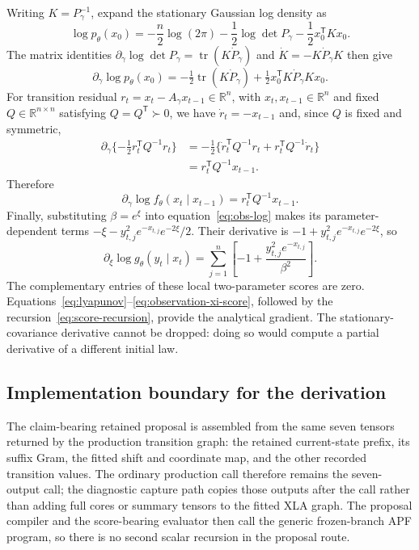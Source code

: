 \documentclass[11pt]{article}
\begin{document}
Writing $K=P_\gamma^{-1}$, expand the stationary Gaussian log density as
\[
\log p_\theta(x_0)
=-\frac n2\log(2\pi)-\frac12\log\det P_\gamma
 -\frac12x_0^\mathsf TKx_0.
\]
The matrix identities
$\partial_\gamma\log\det P_\gamma=\operatorname{tr}(K\dot P_\gamma)$ and
$\dot K=-K\dot P_\gamma K$ then give
\begin{equation}\label{eq:initial-gamma-score}
\partial_\gamma\log p_\theta(x_0)
=-\tfrac12\operatorname{tr}(K\dot P_\gamma)
 +\tfrac12x_0^\mathsf TK\dot P_\gamma Kx_0.
\end{equation}
For transition residual
$r_t=x_t-A_\gamma x_{t-1}\in\mathbb R^n$, with
$x_t,x_{t-1}\in\mathbb R^n$ and fixed $Q\in\mathbb R^{n\times n}$ satisfying
$Q=Q^\mathsf T\succ0$, 
we have $\dot r_t=-x_{t-1}$ and, since $Q$ is fixed and symmetric,
\begin{align*}
\partial_\gamma\{-\tfrac12r_t^\mathsf TQ^{-1}r_t\}
&=-\tfrac12\{\dot r_t^\mathsf TQ^{-1}r_t
 +r_t^\mathsf TQ^{-1}\dot r_t\}\\
&=r_t^\mathsf TQ^{-1}x_{t-1}.
\end{align*}
Therefore
\begin{equation}\label{eq:transition-gamma-score}
\partial_\gamma\log f_\theta(x_t\mid x_{t-1})
=r_t^\mathsf TQ^{-1}x_{t-1}.
\end{equation}
Finally, substituting $\beta=e^\xi$ into equation~\eqref{eq:obs-log} makes its
parameter-dependent terms
$-\xi-y_{t,j}^2e^{-x_{t,j}}e^{-2\xi}/2$. Their derivative is
$-1+y_{t,j}^2e^{-x_{t,j}}e^{-2\xi}$, so
\begin{equation}\label{eq:observation-xi-score}
\partial_\xi\log g_\theta(y_t\mid x_t)
=\sum_{j=1}^n\left[-1+\frac{y_{t,j}^2e^{-x_{t,j}}}{\beta^2}\right].
\end{equation}
The complementary entries of these local two-parameter scores are zero.
Equations~\eqref{eq:lyapunov}--\eqref{eq:observation-xi-score}, followed by
the recursion~\eqref{eq:score-recursion}, provide the analytical gradient.
The stationary-covariance derivative cannot be dropped: doing so would compute
a partial derivative of a different initial law.

\subsection{Implementation boundary for the derivation}

The claim-bearing retained proposal is assembled from the same seven tensors
returned by the production transition graph: the retained current-state
prefix, its suffix Gram, the fitted shift and coordinate map, and the other
recorded transition values.  The ordinary production call therefore remains
the seven-output call; the diagnostic capture path copies those outputs after
the call rather than adding full cores or summary tensors to the fitted XLA
graph.  The proposal compiler and the score-bearing evaluator then call the
generic frozen-branch APF program, so there is no second scalar recursion in
the proposal route.
\end{document}
